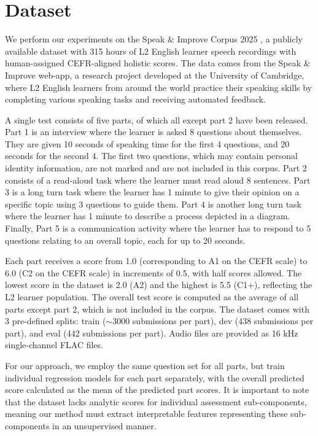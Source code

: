 \documentclass{report}
\begin{document}
\section{Dataset}
\label{sec:dataset}
We perform our experiments on the Speak \& Improve Corpus 2025 \citep{knill2024sandi}, a publicly available dataset with 315 hours of L2 English learner speech recordings with human-assigned CEFR-aligned holistic scores. The data comes from the Speak \& Improve web-app, a research project developed at the University of Cambridge, where L2 English learners from around the world practice their speaking skills by completing various speaking tasks and receiving automated feedback.

A single test consists of five parts, of which all except part 2 have been released. Part 1 is an interview where the learner is asked 8 questions about themselves. They are given 10 seconds of speaking time for the first 4 questions, and 20 seconds for the second 4. The first two questions, which may contain personal identity information, are not marked and are not included in this corpus. Part 2 consists of a read-aloud task where the learner must read aloud 8 sentences. Part 3 is a long turn task where the learner has 1 minute to give their opinion on a specific topic using 3 questions to guide them. Part 4 is another long turn task where the learner has 1 minute to describe a process depicted in a diagram. Finally, Part 5 is a communication activity where the learner has to respond to 5 questions relating to an overall topic, each for up to 20 seconds.

Each part receives a score from 1.0 (corresponding to A1 on the CEFR scale) to 6.0 (C2 on the CEFR scale) in increments of 0.5, with half scores allowed. The lowest score in the dataset is 2.0 (A2) and the highest is 5.5 (C1+), reflecting the L2 learner population. The overall test score is computed as the average of all parts except part 2, which is not included in the corpus. The dataset comes with 3 pre-defined splits: train ($\sim$3000 submissions per part), dev (438 submissions per part), and eval (442 submissions per part). Audio files are provided as 16 kHz single-channel FLAC files.

For our approach, we employ the same question set for all parts, but train individual regression models for each part separately, with the overall predicted score calculated as the mean of the predicted part scores. It is important to note that the dataset lacks analytic scores for individual assessment sub-components, meaning our method must extract interpretable features representing these sub-components in an unsupervised manner.
\end{document}
